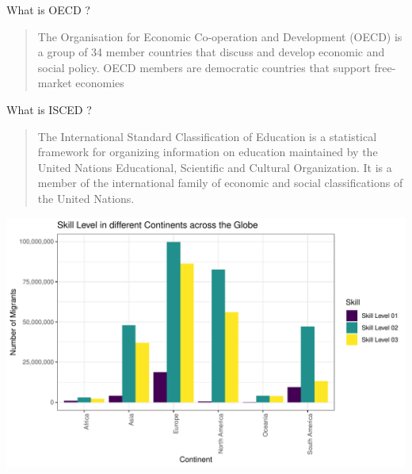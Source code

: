 \documentclass[11pt,a4paper,]{article}
\let\origfigure\figure
\let\endorigfigure\endfigure
\renewenvironment{figure}[1][2] {
    \expandafter\origfigure\expandafter[H]
} {
    \endorigfigure
}%
\begin{document}
What is OECD ?

\begin{quote}
The Organisation for Economic Co-operation and Development (OECD) is a group of 34 member countries that discuss and develop economic and social policy. OECD members are democratic countries that support free-market economies
\end{quote}

What is ISCED ?

\begin{quote}
The International Standard Classification of Education is a statistical framework for organizing information on education maintained by the United Nations Educational, Scientific and Cultural Organization. It is a member of the international family of economic and social classifications of the United Nations.
\end{quote}

\begin{figure}
\centering
\includegraphics{ETC5513assignment4_files/figure-latex/skill-1.pdf}
\caption{\label{fig:skill}Types of Skill}
\end{figure}
\end{document}
